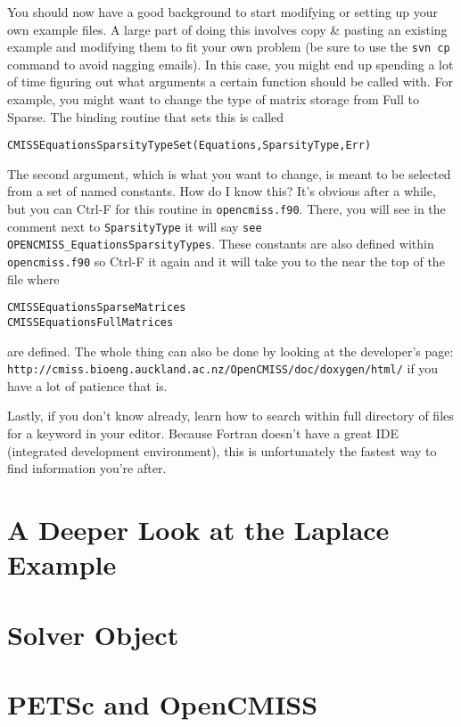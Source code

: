 You should now have a good background to start modifying or setting up your own example files. 
A large part of doing this involves copy \& pasting an existing example and modifying them to fit
your own problem (be sure to use the \texttt{svn cp} command to avoid nagging emails). In this case,
you might end up spending a lot of time figuring out what arguments a certain function should be called 
with. For example, you might want to change the type of matrix storage from Full to Sparse. The 
binding routine that sets this is called
\begin{lstlisting}
CMISSEquationsSparsityTypeSet(Equations,SparsityType,Err)
\end{lstlisting}
The second argument, which is what you want to change, is meant to be selected from a set of named
constants. How do I know this? It's obvious after a while, but you can Ctrl-F for this routine in 
\texttt{opencmiss.f90}. There, you will see in the comment next to \texttt{SparsityType} it will say
\texttt{see OPENCMISS\_EquationsSparsityTypes}. These constants are also defined within 
\texttt{opencmiss.f90} so Ctrl-F it again and it will take you to the near the top of the file where
\begin{lstlisting}
CMISSEquationsSparseMatrices
CMISSEquationsFullMatrices
\end{lstlisting}
are defined. The whole thing can also be done by looking at the developer's page:\\
\texttt{http://cmiss.bioeng.auckland.ac.nz/OpenCMISS/doc/doxygen/html/}
if you have a lot of patience that is.

Lastly, if you don't know already, learn how to search within full directory of files for a keyword 
in your editor. Because Fortran doesn't have a great IDE (integrated development environment), this
is unfortunately the fastest way to find information you're after.


\section{A Deeper Look at the Laplace Example}
\label{sec:devel_laplace}

\section{Solver Object}
\label{sec:devel_solver}

\section{PETSc and OpenCMISS}
\label{sec:devel_petsc}

